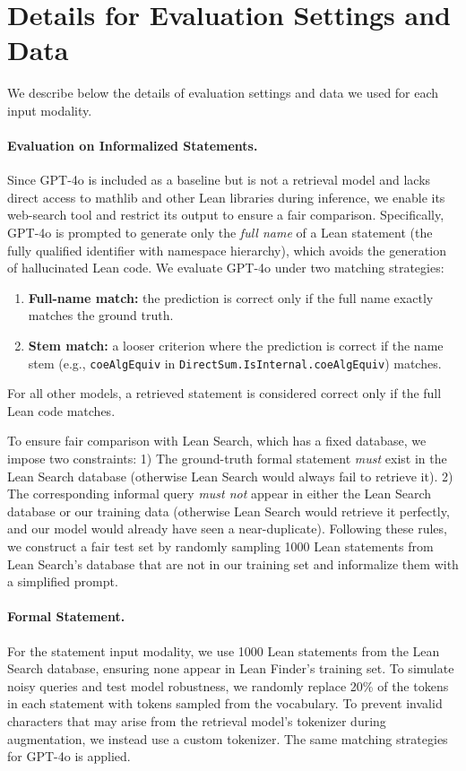 \documentclass{article} %
\begin{document}
\section{Details for Evaluation Settings and Data}
\label{evaluation_settings}

We describe below the details of evaluation settings and data we used for each input modality.

\paragraph{Evaluation on Informalized Statements.}
Since GPT-4o is included as a baseline but is not a retrieval model and lacks direct access to mathlib and other Lean libraries during inference, we enable its web-search tool and restrict its output to ensure a fair comparison. Specifically, GPT-4o is prompted to generate only the \emph{full name} of a Lean statement (the fully qualified identifier with namespace hierarchy), which avoids the generation of hallucinated Lean code. We evaluate GPT-4o under two matching strategies: 
\begin{enumerate}[leftmargin=*]
    \item \textbf{Full-name match:} the prediction is correct only if the full name exactly matches the ground truth. 
    \item \textbf{Stem match:} a looser criterion where the prediction is correct if the name stem (e.g., \texttt{coeAlgEquiv} in \texttt{DirectSum.IsInternal.coeAlgEquiv}) matches.
\end{enumerate}
For all other models, a retrieved statement is considered correct only if the full Lean code matches.

To ensure fair comparison with Lean Search, which has a fixed database, we impose two constraints: 
1) The ground-truth formal statement \emph{must} exist in the Lean Search database (otherwise Lean Search would always fail to retrieve it).
2) The corresponding informal query \emph{must not} appear in either the Lean Search database or our training data (otherwise Lean Search would retrieve it perfectly, and our model would already have seen a near-duplicate).
Following these rules, we construct a fair test set by randomly sampling 1000 Lean statements from Lean Search’s database that are not in our training set and informalize them with a simplified prompt.

\paragraph{Formal Statement.}
For the statement input modality, we use 1000 Lean statements from the Lean Search database, ensuring none appear in Lean Finder’s training set. To simulate noisy queries and test model robustness, we randomly replace 20\% of the tokens in each statement with tokens sampled from the vocabulary. To prevent invalid characters that may arise from the retrieval model’s tokenizer during augmentation, we instead use a custom tokenizer. The same matching strategies for GPT-4o is applied.
\end{document}
